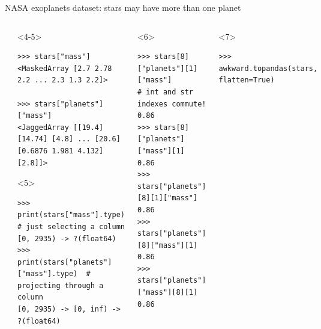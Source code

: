 \documentclass[aspectratio=169]{beamer}
\begin{document}
\begin{frame}[fragile]{NASA exoplanets dataset: stars may have more than one planet}
\begin{columns}
\begin{onlyenv}
\vspace{10 cm}
\end{onlyenv}
\begin{onlyenv}<4-5>
\begin{verbatim}
>>> stars["mass"]
<MaskedArray [2.7 2.78 2.2 ... 2.3 1.3 2.2]>

>>> stars["planets"]["mass"]
<JaggedArray [[19.4] [14.74] [4.8] ... [20.6] [0.6876 1.981 4.132] [2.8]]>
\end{verbatim}

\begin{uncoverenv}<5>
\begin{verbatim}
>>> print(stars["mass"].type)             # just selecting a column
[0, 2935) -> ?(float64)
>>> print(stars["planets"]["mass"].type)  # projecting through a column
[0, 2935) -> [0, inf) -> ?(float64)
\end{verbatim}
\end{uncoverenv}

\vspace{10 cm}
\end{onlyenv}
\begin{onlyenv}<6>
\begin{verbatim}
>>> stars[8]["planets"][1]["mass"]        # int and str indexes commute!
0.86
>>> stars[8]["planets"]["mass"][1]
0.86
>>> stars["planets"][8][1]["mass"]
0.86
>>> stars["planets"][8]["mass"][1]
0.86
>>> stars["planets"]["mass"][8][1]
0.86
\end{verbatim}

\vspace{10 cm}
\end{onlyenv}
\begin{onlyenv}<7>
\vspace{-0.4 cm}
\begin{verbatim}
>>> awkward.topandas(stars, flatten=True)
\end{verbatim}


\end{onlyenv}
\end{columns}
\end{frame}
\end{document}
